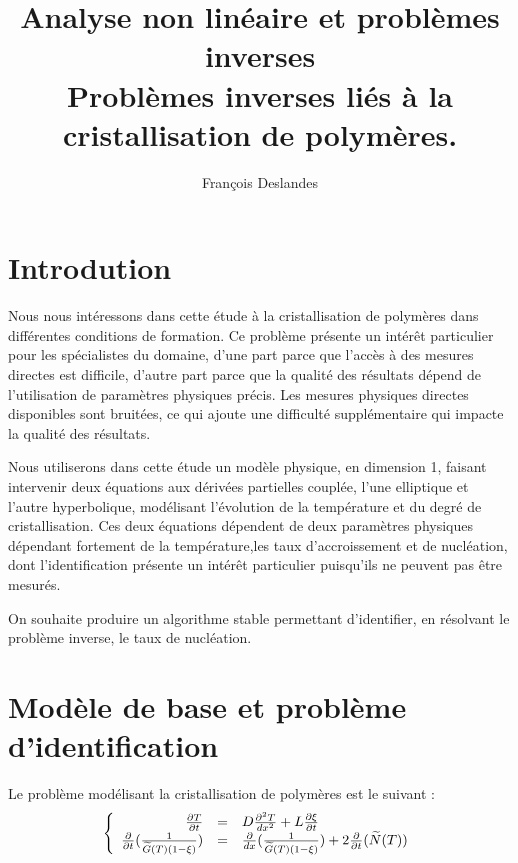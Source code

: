 \documentclass[a4paper,10pt]{article}
\author{François Deslandes}
\affil{Génie Mathématique 5ème année}
\affil{A l'attention de M. Caputo}
\title{\Huge{Analyse non linéaire et problèmes inverses}\\
\LARGE{Problèmes inverses liés à la cristallisation de polymères.}\\
\vspace{10mm}
}
\begin{document}
\maketitle\thispagestyle{empty}
 
\newpage\null\thispagestyle{empty}\setcounter{page}{0}

\newpage
\tableofcontents
\newpage

\section{Introdution}
Nous nous intéressons dans cette étude à la cristallisation de polymères dans différentes conditions de formation. Ce problème présente un intér\^et particulier pour les spécialistes du domaine, d'une part parce que l'accès à des mesures directes est difficile, d'autre part parce que la qualité des résultats dépend de l'utilisation de paramètres physiques précis. Les mesures physiques directes disponibles sont bruitées, ce qui ajoute une difficulté supplémentaire qui impacte la qualité des résultats.


Nous utiliserons dans cette étude un modèle physique, en dimension 1, faisant intervenir deux équations aux dérivées partielles couplée, l'une elliptique et l'autre hyperbolique, modélisant l'évolution de la température et du degré de cristallisation. Ces deux équations dépendent de deux paramètres physiques dépendant fortement de la température,les taux d'accroissement et de nucléation, dont l'identification présente un intérêt particulier puisqu'ils ne peuvent pas être mesurés.


On souhaite produire un algorithme stable permettant d'identifier, en résolvant le problème inverse, le taux de nucléation.

\section{Modèle de base et problème d'identification}

Le problème modélisant la cristallisation de polymères est le suivant :
\[
\left\{
\begin{array}{r c l}
\frac{\partial T}{\partial t} &=& 
			D \frac{\partial ^2T}{dx ^2} 
			+ L \frac{\partial \xi}{\partial t} \\
					
\frac{\partial }{\partial t} (\frac{1}{\widetilde{G}(T) (1-\xi)}) &=& 
			\frac{\partial}{dx} (\frac{1}{\widetilde{G}(T) (1-\xi)})
			+ 2 \frac{\partial }{\partial t}(\widetilde{N}(T))
\end{array}
\right.
\]
\end{document}

